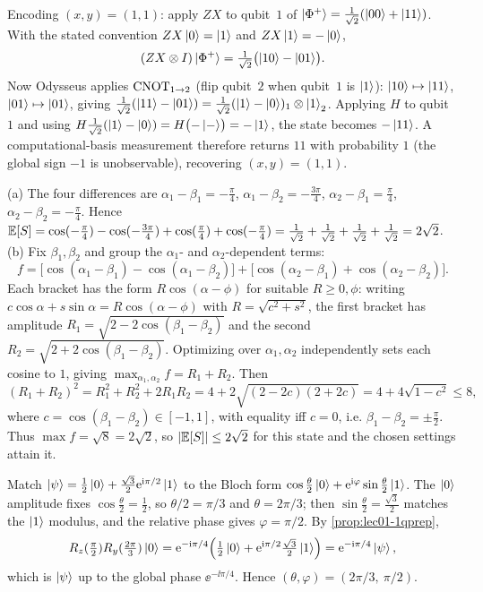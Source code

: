 \begin{solution}
Encoding $(x,y)=(1,1)$: apply $ZX$ to qubit~$1$ of
$\ket{\Phi^{+}}=\tfrac{1}{\sqrt2}(\ket{00}+\ket{11})$. With the stated convention
$ZX\ket{0}=\ket{1}$ and $ZX\ket{1}=-\ket{0}$,
\[
  (ZX\otimes I)\ket{\Phi^{+}}=\tfrac{1}{\sqrt2}\bigl(\ket{10}-\ket{01}\bigr).
\]
Now Odysseus applies $\mathrm{CNOT}_{1\to2}$ (flip qubit~$2$ when qubit~$1$ is $\ket{1}$):
$\ket{10}\mapsto\ket{11}$, $\ket{01}\mapsto\ket{01}$, giving
$\tfrac{1}{\sqrt2}(\ket{11}-\ket{01})=\tfrac{1}{\sqrt2}(\ket{1}-\ket{0})_1\otimes\ket{1}_2$.
Applying $H$ to qubit~$1$ and using $H\tfrac{1}{\sqrt2}(\ket{1}-\ket{0})=H\bigl(-\ket{-}\bigr)=-\ket{1}$,
the state becomes $-\ket{11}$. A computational-basis measurement therefore returns
$11$ with probability $1$ (the global sign $-1$ is unobservable), recovering
$(x,y)=(1,1)$.
\end{solution}

\begin{solution}
(a) The four differences are $\alpha_1-\beta_1=-\tfrac{\pi}{4}$,
$\alpha_1-\beta_2=-\tfrac{3\pi}{4}$, $\alpha_2-\beta_1=\tfrac{\pi}{4}$,
$\alpha_2-\beta_2=-\tfrac{\pi}{4}$. Hence
$\mathbb{E}[S]=\cos(-\tfrac{\pi}{4})-\cos(-\tfrac{3\pi}{4})+\cos(\tfrac{\pi}{4})+\cos(-\tfrac{\pi}{4})
=\tfrac{1}{\sqrt2}+\tfrac{1}{\sqrt2}+\tfrac{1}{\sqrt2}+\tfrac{1}{\sqrt2}=2\sqrt2$.
(b) Fix $\beta_1,\beta_2$ and group the $\alpha_1$- and $\alpha_2$-dependent terms:
\[
  f=\bigl[\cos(\alpha_1-\beta_1)-\cos(\alpha_1-\beta_2)\bigr]
    +\bigl[\cos(\alpha_2-\beta_1)+\cos(\alpha_2-\beta_2)\bigr].
\]
Each bracket has the form $R\cos(\alpha-\phi)$ for suitable $R\ge0,\phi$: writing
$c\cos\alpha+s\sin\alpha=R\cos(\alpha-\phi)$ with $R=\sqrt{c^2+s^2}$, the first bracket
has amplitude $R_1=\sqrt{2-2\cos(\beta_1-\beta_2)}$ and the second
$R_2=\sqrt{2+2\cos(\beta_1-\beta_2)}$. Optimizing over $\alpha_1,\alpha_2$ independently
sets each cosine to $1$, giving $\max_{\alpha_1,\alpha_2}f=R_1+R_2$. Then
\[
  (R_1+R_2)^2=R_1^2+R_2^2+2R_1R_2=4+2\sqrt{(2-2c)(2+2c)}=4+4\sqrt{1-c^2}\le 8,
\]
where $c=\cos(\beta_1-\beta_2)\in[-1,1]$, with equality iff $c=0$, i.e.
$\beta_1-\beta_2=\pm\tfrac{\pi}{2}$. Thus $\max f=\sqrt8=2\sqrt2$, so
$\left\lvert \mathbb{E}[S] \right\rvert\le 2\sqrt2$ for this state and the chosen settings attain it.
\end{solution}

\begin{solution}
Match $\ket{\psi}=\tfrac12\ket{0}+\tfrac{\sqrt3}{2}\mathrm{e}^{\mathrm{i}\pi/2}\ket{1}$ to the Bloch
form $\cos\tfrac{\theta}{2}\ket{0}+\mathrm{e}^{\mathrm{i}\varphi}\sin\tfrac{\theta}{2}\ket{1}$. The
$\ket{0}$ amplitude fixes $\cos\tfrac{\theta}{2}=\tfrac12$, so $\theta/2=\pi/3$ and
$\theta=2\pi/3$; then $\sin\tfrac{\theta}{2}=\tfrac{\sqrt3}{2}$ matches the $\ket{1}$
modulus, and the relative phase gives $\varphi=\pi/2$. By \cref{prop:lec01-1qprep},
\[
  R_{z}(\tfrac{\pi}{2})R_{y}(\tfrac{2\pi}{3})\ket{0}
    =\mathrm{e}^{-\mathrm{i}\pi/4}\Bigl(\tfrac12\ket{0}+\mathrm{e}^{\mathrm{i}\pi/2}\tfrac{\sqrt3}{2}\ket{1}\Bigr)
    =\mathrm{e}^{-\mathrm{i}\pi/4}\ket{\psi},
\]
which is $\ket{\psi}$ up to the global phase $\ee^{-\ii\pi/4}$. Hence
$(\theta,\varphi)=(2\pi/3,\ \pi/2)$.
\end{solution}

